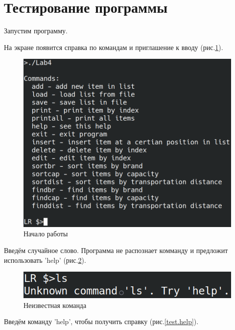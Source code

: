 \section*{Тестирование программы}

Запустим программу.

На экране появится справка по командам и 
приглашение к вводу (рис.\ref{test.start}).

\begin{figure}[H]
    \centering
    \includegraphics[width=0.9\linewidth]{photo/test.start}
    \caption{Начало работы}
    \label{test.start}
\end{figure}

Введём случайное слово. 
Программа не распознает комманду и предложит 
использовать 'help' (рис.\ref{test.unknown_command}). 

\begin{figure}[H]
    \centering
    \includegraphics[width=0.9\linewidth]{photo/test.unknown_command}
    \caption{Неизвестная команда}
    \label{test.unknown_command}
\end{figure}

Введём команду 'help', чтобы получить справку (рис.\ref{test.help}).

